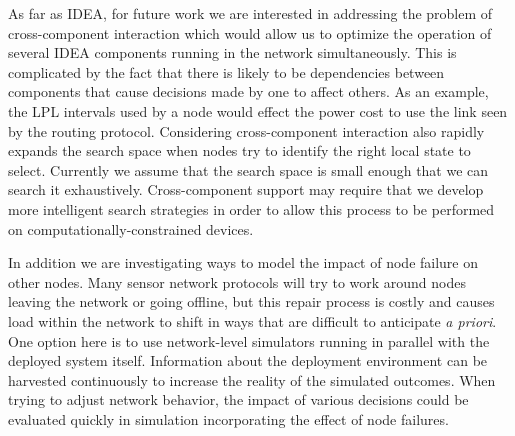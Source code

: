 As far as IDEA, for future work we are interested in addressing the problem
of cross-component interaction which would allow us to optimize the operation
of several IDEA components running in the network simultaneously. This is
complicated by the fact that there is likely to be dependencies between
components that cause decisions made by one to affect others. As an example,
the LPL intervals used by a node would effect the power cost to use the link
seen by the routing protocol. Considering cross-component interaction also
rapidly expands the search space when nodes try to identify the right local
state to select. Currently we assume that the search space is small enough
that we can search it exhaustively. Cross-component support may require that
we develop more intelligent search strategies in order to allow this process
to be performed on computationally-constrained devices.

In addition we are investigating ways to model the impact of node failure on
other nodes. Many sensor network protocols will try to work around nodes
leaving the network or going offline, but this repair process is costly and
causes load within the network to shift in ways that are difficult to
anticipate \textit{a priori}. One option here is to use network-level
simulators running in parallel with the deployed system itself. Information
about the deployment environment can be harvested continuously to increase
the reality of the simulated outcomes. When trying to adjust network
behavior, the impact of various decisions could be evaluated quickly in
simulation incorporating the effect of node failures.
